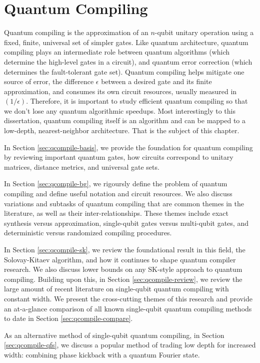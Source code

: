 \chapter{Quantum Compiling}
\label{chap:qcompile}

Quantum compiling is the approximation of an $n$-qubit
unitary operation using a fixed, finite, universal set
of simpler gates. Like quantum architecture, quantum
compiling plays an intermediate role between quantum
algorithms (which determine the high-level gates in a circuit),
and quantum error correction (which determines the
fault-tolerant gate set).
Quantum compiling helps mitigate one source of error,
the difference $\epsilon$ between a desired gate and its
finite approximation,
and consumes its own circuit resources, usually measured in
$(1 / \epsilon)$.
Therefore, it is important to study efficient quantum 
compiling so that we don't lose any quantum algorithmic speedups.
Most interestingly to this dissertation, quantum compiling itself
is an algorithm and can be mapped to a low-depth, nearest-neighbor
architecture. That is the subject of this chapter.

In Section \ref{sec:qcompile-basis}, we provide the foundation
for quantum compiling by reviewing important quantum gates,
how circuits correspond to unitary matrices, distance metrics,
and universal gate sets.

In Section \ref{sec:qcompile-bg}, we rigoursly define the problem of
quantum compiling and define useful notation and circuit resources.
We also discuss
variations and subtasks of quantum compiling that are common themes
in the literature, as well as their inter-relationships.
These themes include exact synthesis versus approximation,
single-qubit gates versus multi-qubit gates, and deterministic
versus randomized compiling procedures.

In Section \ref{sec:qcompile-sk}, we review the foundational
result in this field, the Solovay-Kitaev algorithm, and how it
continues to shape quantum compiler research. We also discuss
lower bounds on any SK-style approach to quantum compiling.
Building upon this,
in Section \ref{sec:qcompile-review}, we review the large
amount of recent literature on single-qubit quantum compiling with
constant width. We present
the cross-cutting themes of this research and provide an
at-a-glance comparison of all known single-qubit quantum compiling methods
to date in Section \ref{sec:qcompile-compare}.

As an alternative method of single-qubit quantum compiling,
in Section \ref{sec:qcompile-qfs}, we
discuss a popular method of trading low depth for increased
width: combining phase kickback with a quantum Fourier state.

